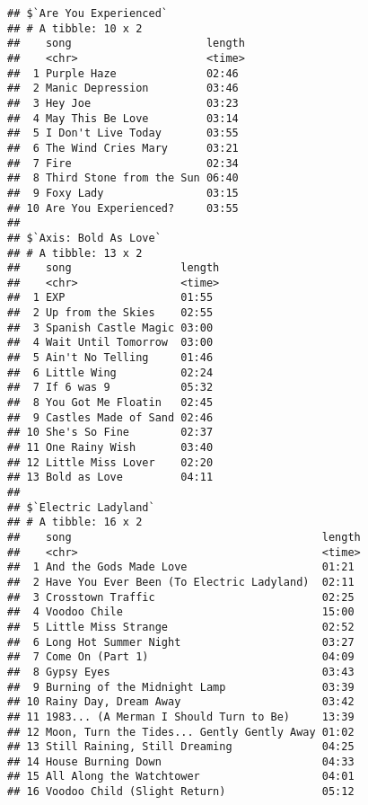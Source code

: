 \documentclass[]{article}
\newenvironment{Shaded}{\begin{snugshade}}{\end{snugshade}}
\newcommand{\KeywordTok}[1]{\textcolor[rgb]{0.13,0.29,0.53}{\textbf{#1}}}
\newcommand{\DataTypeTok}[1]{\textcolor[rgb]{0.13,0.29,0.53}{#1}}
\newcommand{\StringTok}[1]{\textcolor[rgb]{0.31,0.60,0.02}{#1}}
\newcommand{\CommentTok}[1]{\textcolor[rgb]{0.56,0.35,0.01}{\textit{#1}}}
\newcommand{\OperatorTok}[1]{\textcolor[rgb]{0.81,0.36,0.00}{\textbf{#1}}}
\newcommand{\NormalTok}[1]{#1}
\begin{document}
\begin{verbatim}
## $`Are You Experienced`
## # A tibble: 10 x 2
##    song                     length
##    <chr>                    <time>
##  1 Purple Haze              02:46 
##  2 Manic Depression         03:46 
##  3 Hey Joe                  03:23 
##  4 May This Be Love         03:14 
##  5 I Don't Live Today       03:55 
##  6 The Wind Cries Mary      03:21 
##  7 Fire                     02:34 
##  8 Third Stone from the Sun 06:40 
##  9 Foxy Lady                03:15 
## 10 Are You Experienced?     03:55 
## 
## $`Axis: Bold As Love`
## # A tibble: 13 x 2
##    song                 length
##    <chr>                <time>
##  1 EXP                  01:55 
##  2 Up from the Skies    02:55 
##  3 Spanish Castle Magic 03:00 
##  4 Wait Until Tomorrow  03:00 
##  5 Ain't No Telling     01:46 
##  6 Little Wing          02:24 
##  7 If 6 was 9           05:32 
##  8 You Got Me Floatin   02:45 
##  9 Castles Made of Sand 02:46 
## 10 She's So Fine        02:37 
## 11 One Rainy Wish       03:40 
## 12 Little Miss Lover    02:20 
## 13 Bold as Love         04:11 
## 
## $`Electric Ladyland`
## # A tibble: 16 x 2
##    song                                       length
##    <chr>                                      <time>
##  1 And the Gods Made Love                     01:21 
##  2 Have You Ever Been (To Electric Ladyland)  02:11 
##  3 Crosstown Traffic                          02:25 
##  4 Voodoo Chile                               15:00 
##  5 Little Miss Strange                        02:52 
##  6 Long Hot Summer Night                      03:27 
##  7 Come On (Part 1)                           04:09 
##  8 Gypsy Eyes                                 03:43 
##  9 Burning of the Midnight Lamp               03:39 
## 10 Rainy Day, Dream Away                      03:42 
## 11 1983... (A Merman I Should Turn to Be)     13:39 
## 12 Moon, Turn the Tides... Gently Gently Away 01:02 
## 13 Still Raining, Still Dreaming              04:25 
## 14 House Burning Down                         04:33 
## 15 All Along the Watchtower                   04:01 
## 16 Voodoo Child (Slight Return)               05:12
\end{verbatim}

\begin{Shaded}
\end{Shaded}
\end{document}
